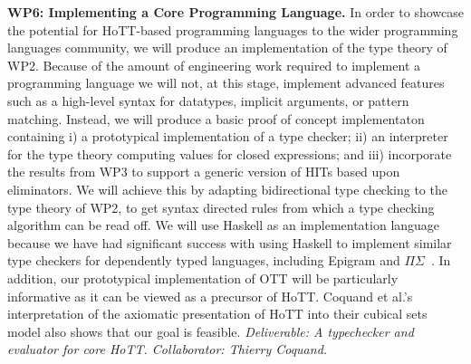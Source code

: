 \documentclass[a4paper,11pt]{article}
\begin{document}
{\bf WP6: Implementing a Core Programming Language.} In order to
showcase the potential for HoTT-based programming languages to the
wider programming languages
community,%
we will produce an implementation of the type theory of WP2.  Because
of the amount of engineering work required to implement a programming
language we will not, at this stage, implement advanced features such
as a high-level syntax for datatypes, implicit arguments, or pattern
matching. Instead, we will produce a basic proof of concept
implementaton containing i) a prototypical implementation of a type
checker; ii) an interpreter for the type theory computing values for
closed expressions; and iii) incorporate the results from WP3 to
support a generic version of HITs based upon eliminators. We will
achieve this by adapting bidirectional type checking to the type
theory of WP2, to get syntax directed rules from which a type checking
algorithm can be read off. We will use Haskell as an implementation
language because we have had significant success with using Haskell to
implement similar type checkers for dependently typed languages,
including Epigram and
$\Pi\Sigma$~\cite{alti:checking,easy,alti:pisigma-new}.  In addition,
our prototypical implementation of OTT will be particularly
informative as it can be viewed as a precursor of HoTT.  Coquand et
al.'s interpretation of the axiomatic presentation of HoTT into their
cubical sets model also shows that our goal is feasible. {\em
  Deliverable: A typechecker and evaluator for core HoTT.
  Collaborator: Thierry Coquand.  }


\end{document}
